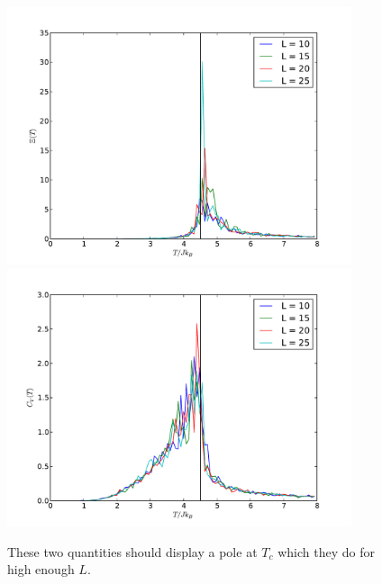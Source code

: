 \documentclass[a4paper]{scrreprt}
\begin{document}
\begin{figure}[h!]
    \begin{center}
        \includegraphics[width=0.9\textwidth]{xi} \\
        \includegraphics[width=0.9\textwidth]{cv}
    \end{center}
    \caption*{These two quantities should display a pole at $T_c$ which they do for high enough $L$.}
    \label{fig:ex6res}
\end{figure}
\end{document}
